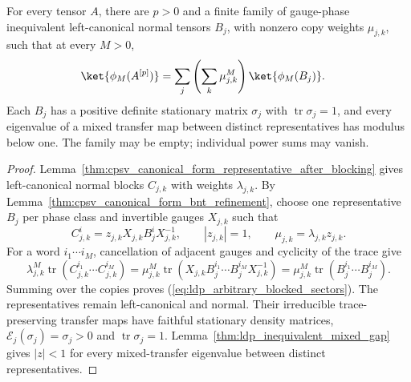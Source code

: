 \begin{lemma}
    \label{lem:ldp_arbitrary_blocked_sectors}
    \leanok
    For every tensor $A$, there are $p>0$ and a finite family of gauge-phase inequivalent
    left-canonical normal tensors $B_j$, with nonzero copy weights
    $\mu_{j,k}$, such that at every $M>0$,
    \begin{align}
        \ket{\phi_M(A^{[p]})}
         & =\sum_j\left(\sum_k\mu_{j,k}^{M}\right)\ket{\phi_M(B_j)}.
        \label{eq:ldp_arbitrary_blocked_sectors}
    \end{align}
    Each $B_j$ has a positive definite stationary matrix $\sigma_j$ with
    $\operatorname{tr}\sigma_j=1$, and every eigenvalue of a mixed transfer
    map between distinct representatives has modulus below one. The family
    may be empty; individual power sums may vanish.
\end{lemma}
\begin{proof}
    \leanok
    Lemma~\ref{thm:cpsv_canonical_form_representative_after_blocking}
    gives left-canonical normal blocks $C_{j,k}$ with weights $\lambda_{j,k}$.
    By Lemma~\ref{thm:cpsv_canonical_form_bnt_refinement}, choose one
    representative $B_j$ per phase class and invertible gauges $X_{j,k}$ such that
    \[
        C_{j,k}^{i}=z_{j,k}X_{j,k}B_j^{i}X_{j,k}^{-1},
        \qquad |z_{j,k}|=1,\qquad \mu_{j,k}=\lambda_{j,k}z_{j,k}.
    \]
    For a word $i_1\cdots i_M$, cancellation of adjacent gauges and cyclicity
    of the trace give
    \[
        \lambda_{j,k}^{M}\operatorname{tr}
        (C_{j,k}^{i_1}\cdots C_{j,k}^{i_M})
        =\mu_{j,k}^{M}\operatorname{tr}
        (X_{j,k}B_j^{i_1}\cdots B_j^{i_M}X_{j,k}^{-1})
        =\mu_{j,k}^{M}\operatorname{tr}(B_j^{i_1}\cdots B_j^{i_M}).
    \]
    Summing over the copies proves (\ref{eq:ldp_arbitrary_blocked_sectors}).
    The representatives remain left-canonical and normal. Their irreducible
    trace-preserving transfer maps have faithful stationary density matrices,
    $\mathcal E_j(\sigma_j)=\sigma_j>0$ and $\operatorname{tr}\sigma_j=1$.
    Lemma~\ref{thm:ldp_inequivalent_mixed_gap} gives
    $|z|<1$ for every mixed-transfer eigenvalue between distinct representatives.
\end{proof}

